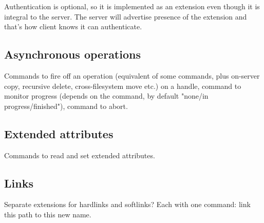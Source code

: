 Authentication is optional, so it is implemented as an extension even though it is integral to the server. The
server will advertise presence of the extension and that's how client knows it can authenticate.

\subsection{Asynchronous operations}

Commands to fire off an operation (equivalent of some commands, plus on-server copy, recursive delete,
cross-filesystem move etc.) on a handle, command to monitor progress (depends on the command, by default
"none/in progress/finished"), command to abort.

\subsection{Extended attributes}

Commands to read and set extended attributes.

\subsection{Links}

Separate extensions for hardlinks and softlinks? Each with one command: link this path to this new name.
